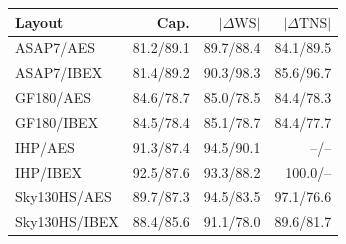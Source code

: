 \begin{tabular*}{\columnwidth}{@{\extracolsep{\fill}}lrrr@{}}
\toprule
Layout & Cap. & $|\Delta\mathrm{WS}|$ & $|\Delta\mathrm{TNS}|$ \\
\midrule
ASAP7/AES & 81.2/89.1 & 89.7/88.4 & 84.1/89.5 \\
ASAP7/IBEX & 81.4/89.2 & 90.3/98.3 & 85.6/96.7 \\
GF180/AES & 84.6/78.7 & 85.0/78.5 & 84.4/78.3 \\
GF180/IBEX & 84.5/78.4 & 85.1/78.7 & 84.4/77.7 \\
IHP/AES & 91.3/87.4 & 94.5/90.1 & --/-- \\
IHP/IBEX & 92.5/87.6 & 93.3/88.2 & 100.0/-- \\
Sky130HS/AES & 89.7/87.3 & 94.5/83.5 & 97.1/76.6 \\
Sky130HS/IBEX & 88.4/85.6 & 91.1/78.0 & 89.6/81.7 \\
\bottomrule
\end{tabular*}
